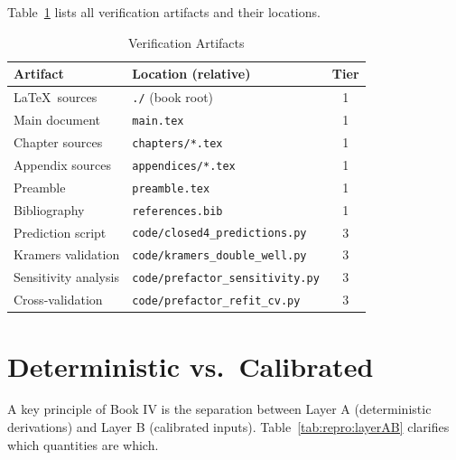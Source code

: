 Table~\ref{tab:repro:artifacts} lists all verification artifacts and their
locations.

\begin{table}[htbp]
\centering
\caption{Verification Artifacts}
\label{tab:repro:artifacts}
\begin{tabular}{llc}
    \toprule
    Artifact & Location (relative) & Tier \\
    \midrule
    \LaTeX\ sources & \texttt{./} (book root) & 1 \\
    Main document & \texttt{main.tex} & 1 \\
    Chapter sources & \texttt{chapters/*.tex} & 1 \\
    Appendix sources & \texttt{appendices/*.tex} & 1 \\
    Preamble & \texttt{preamble.tex} & 1 \\
    Bibliography & \texttt{references.bib} & 1 \\
    \midrule
    Prediction script & \texttt{code/closed4\_predictions.py} & 3 \\
    Kramers validation & \texttt{code/kramers\_double\_well.py} & 3 \\
    Sensitivity analysis & \texttt{code/prefactor\_sensitivity.py} & 3 \\
    Cross-validation & \texttt{code/prefactor\_refit\_cv.py} & 3 \\
    \bottomrule
\end{tabular}
\end{table}

\section{Deterministic vs.\ Calibrated}
\label{sec:repro:separation}

A key principle of Book IV is the separation between Layer A (deterministic
derivations) and Layer B (calibrated inputs). Table~\ref{tab:repro:layerAB}
clarifies which quantities are which.

